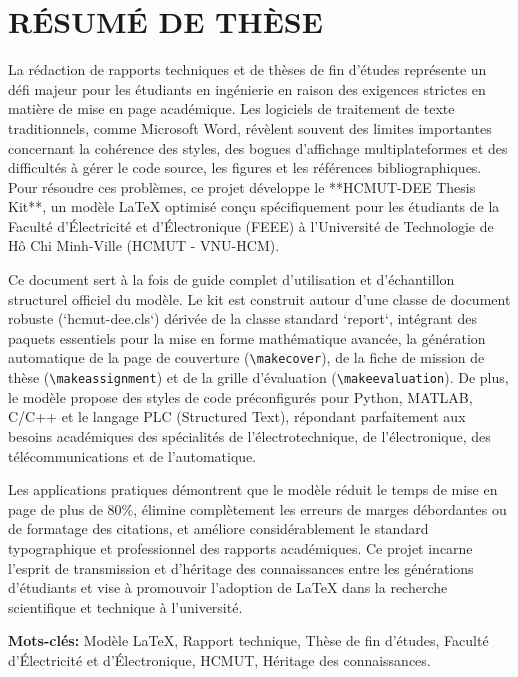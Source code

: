 
\chapter*{RÉSUMÉ DE THÈSE}

La rédaction de rapports techniques et de thèses de fin d'études représente un défi majeur pour les étudiants en ingénierie en raison des exigences strictes en matière de mise en page académique. Les logiciels de traitement de texte traditionnels, comme Microsoft Word, révèlent souvent des limites importantes concernant la cohérence des styles, des bogues d'affichage multiplateformes et des difficultés à gérer le code source, les figures et les références bibliographiques. Pour résoudre ces problèmes, ce projet développe le **HCMUT-DEE Thesis Kit**, un modèle LaTeX optimisé conçu spécifiquement pour les étudiants de la Faculté d'Électricité et d'Électronique (FEEE) à l'Université de Technologie de Hô Chi Minh-Ville (HCMUT - VNU-HCM).

Ce document sert à la fois de guide complet d'utilisation et d'échantillon structurel officiel du modèle. Le kit est construit autour d'une classe de document robuste (`hcmut-dee.cls`) dérivée de la classe standard `report`, intégrant des paquets essentiels pour la mise en forme mathématique avancée, la génération automatique de la page de couverture (\texttt{\textbackslash makecover}), de la fiche de mission de thèse (\texttt{\textbackslash makeassignment}) et de la grille d'évaluation (\texttt{\textbackslash makeevaluation}). De plus, le modèle propose des styles de code préconfigurés pour Python, MATLAB, C/C++ et le langage PLC (Structured Text), répondant parfaitement aux besoins académiques des spécialités de l'électrotechnique, de l'électronique, des télécommunications et de l'automatique.

Les applications pratiques démontrent que le modèle réduit le temps de mise en page de plus de 80\%, élimine complètement les erreurs de marges débordantes ou de formatage des citations, et améliore considérablement le standard typographique et professionnel des rapports académiques. Ce projet incarne l'esprit de transmission et d'héritage des connaissances entre les générations d'étudiants et vise à promouvoir l'adoption de LaTeX dans la recherche scientifique et technique à l'université.

\vspace{0.5cm}
\noindent \textbf{Mots-clés:} Modèle LaTeX, Rapport technique, Thèse de fin d'études, Faculté d'Élec\-tri\-ci\-té et d'Élec\-tro\-nique, HCMUT, Héritage des connaissances.
